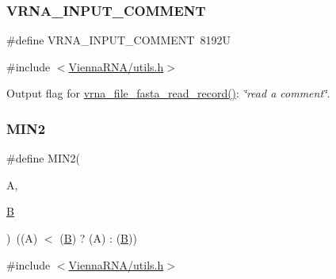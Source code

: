\mbox{\label{group__utils_gaf2062e0eeefffd3ed639af460b3d4fab}} 
\subsubsection{\texorpdfstring{V\+R\+N\+A\+\_\+\+I\+N\+P\+U\+T\+\_\+\+C\+O\+M\+M\+E\+NT}{VRNA\_INPUT\_COMMENT}}
{\footnotesize\ttfamily \#define V\+R\+N\+A\+\_\+\+I\+N\+P\+U\+T\+\_\+\+C\+O\+M\+M\+E\+NT~8192U}



{\ttfamily \#include $<$\mbox{\hyperlink{utils_8h}{Vienna\+R\+N\+A/utils.\+h}}$>$}



Output flag for \mbox{\hyperlink{group__file__utils_ga8cfb7e271efc9e1f34640acb85475639}{vrna\+\_\+file\+\_\+fasta\+\_\+read\+\_\+record()}}\+: {\itshape \char`\"{}read a comment\char`\"{}}. 

\mbox{\label{group__utils_gae0b9cd0ce090bd69b951aa73e8fa4f7d}} 
\subsubsection{\texorpdfstring{M\+I\+N2}{MIN2}}
{\footnotesize\ttfamily \#define M\+I\+N2(\begin{DoxyParamCaption}\item[{}]{A,  }\item[{}]{\mbox{\hyperlink{group__energy__parameters__rw_gga7bf2bb363bcf5ce50d60255d256e5682a3f2a77ecd272aa6d6b5902faa5e5fc68}{B}} }\end{DoxyParamCaption})~((A) $<$ (\mbox{\hyperlink{group__energy__parameters__rw_gga7bf2bb363bcf5ce50d60255d256e5682a3f2a77ecd272aa6d6b5902faa5e5fc68}{B}}) ? (A) \+: (\mbox{\hyperlink{group__energy__parameters__rw_gga7bf2bb363bcf5ce50d60255d256e5682a3f2a77ecd272aa6d6b5902faa5e5fc68}{B}}))}



{\ttfamily \#include $<$\mbox{\hyperlink{utils_8h}{Vienna\+R\+N\+A/utils.\+h}}$>$}



